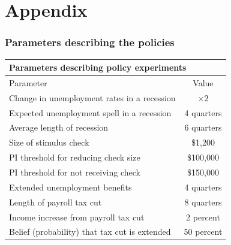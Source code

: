 \documentclass[pdflatex,aspectratio=169]{beamer}
\begin{document}
\section{Appendix}

\begin{frame}
\frametitle{Parameters describing the policies \hyperlink{sli:paramsByEd} {}}
\label{sli:policies}
\centering 
\begin{tabular}{lc}
	\toprule 
	\multicolumn{2}{l}{Parameters describing policy experiments} \\ \midrule 
	Parameter & Value \\ \midrule 
	Change in unemployment rates in a recession & $\times 2$ \\ 
	Expected unemployment spell in a recession & 4 quarters \\ 
	Average length of recession & 6 quarters \\ 
	Size of stimulus check & \$1,200 \\ 
	PI threshold for reducing check size & \$100,000 \\ 
	PI threshold for not receiving check & \$150,000 \\ 
	Extended unemployment benefits & 4 quarters \\
	Length of payroll tax cut & 8 quarters \\ 
	Income increase from payroll tax cut & 2 percent \\ 
	Belief (probability) that tax cut is extended & 50 percent 		
	\\ \bottomrule
\end{tabular} 
\end{frame}
\end{document}
